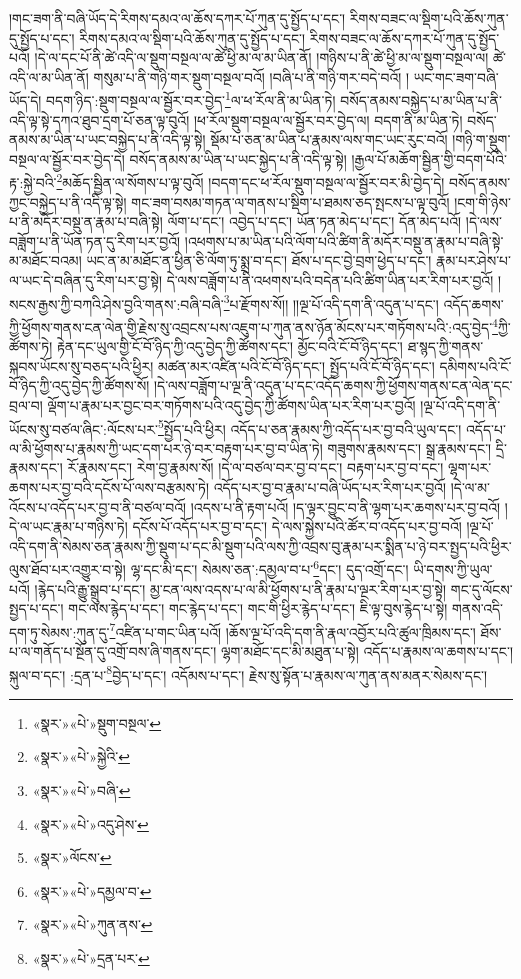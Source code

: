 །གང་ཟག་ནི་བཞི་ཡོད་དེ་རིགས་དམའ་ལ་ཆོས་དཀར་པོ་ཀུན་དུ་སྤྱོད་པ་དང་། རིགས་བཟང་ལ་སྡིག་པའི་ཆོས་ཀུན་དུ་སྤྱོད་པ་དང་། རིགས་དམའ་ལ་སྡིག་པའི་ཆོས་ཀུན་དུ་སྤྱོད་པ་དང་། རིགས་བཟང་ལ་ཆོས་དཀར་པོ་ཀུན་དུ་སྤྱོད་པའོ། །དེ་ལ་དང་པོ་ནི་ཚེ་འདི་ལ་སྡུག་བསྔལ་ལ་ཚེ་ཕྱི་མ་ལ་མ་ཡིན་ནོ། །གཉིས་པ་ནི་ཚེ་ཕྱི་མ་ལ་སྡུག་བསྔལ་ལ། ཚེ་འདི་ལ་མ་ཡིན་ནོ། གསུམ་པ་ནི་གཉི་གར་སྡུག་བསྔལ་བའོ། །བཞི་པ་ནི་གཉི་གར་བདེ་བའོ། །
ཡང་གང་ཟག་བཞི་ཡོད་དེ། བདག་ཉིད་:སྡུག་བསྔལ་ལ་སྦྱོར་བར་བྱེད་\footnote{«སྣར་»«པེ་»སྡུག་བསྔལ་}ལ་ཕ་རོལ་ནི་མ་ཡིན་ཏེ། བསོད་ནམས་བསྐྱེད་པ་མ་ཡིན་པ་ནི་འདི་ལྟ་སྟེ་དཀའ་ཐུབ་དྲག་པོ་ཅན་ལྟ་བུའོ། །ཕ་རོལ་སྡུག་བསྔལ་ལ་སྦྱོར་བར་བྱེད་ལ། བདག་ནི་མ་ཡིན་ཏེ། བསོད་ནམས་མ་ཡིན་པ་ཡང་བསྐྱེད་པ་ནི་འདི་ལྟ་སྟེ། སྡོམ་པ་ཅན་མ་ཡིན་པ་རྣམས་ལས་གང་ཡང་རུང་བའོ། །གཉི་ག་སྡུག་བསྔལ་ལ་སྦྱོར་བར་བྱེད་དེ། བསོད་ནམས་མ་ཡིན་པ་ཡང་སྐྱེད་པ་ནི་འདི་ལྟ་སྟེ། །རྒྱལ་པོ་མཆོག་སྦྱིན་གྱི་བདག་པོའི་རྟ་:སྐྱེ་བའི་\footnote{«སྣར་»«པེ་»སྐྱེའི་}མཆོད་སྦྱིན་ལ་སོགས་པ་ལྟ་བུའོ། །བདག་དང་ཕ་རོལ་སྡུག་བསྔལ་ལ་སྦྱོར་བར་མི་བྱེད་དེ། བསོད་ནམས་ཀྱང་བསྐྱེད་པ་ནི་འདི་ལྟ་སྟེ། གང་ཟག་བསམ་གཏན་ལ་གནས་པ་སྡིག་པ་ཐམས་ཅད་སྤངས་པ་ལྟ་བུའོ། །ངག་གི་ཉེས་པ་ནི་མདོར་བསྡུ་ན་རྣམ་པ་བཞི་སྟེ། ལོག་པ་དང་། འབྱེད་པ་དང་། ཡོན་ཏན་མེད་པ་དང་། དོན་མེད་པའོ། །དེ་ལས་བཟློག་པ་ནི་ཡོན་ཏན་དུ་རིག་པར་བྱའོ། །འཕགས་པ་མ་ཡིན་པའི་ལོག་པའི་ཚིག་ནི་མདོར་བསྡུ་ན་རྣམ་པ་བཞི་སྟེ་མ་མཐོང་བའམ། ཡང་ན་མ་མཐོང་ན་ཕྱིན་ཅི་ལོག་ཏུ་སྨྲ་བ་དང་། ཐོས་པ་དང་བྱེ་བྲག་ཕྱེད་པ་དང་། རྣམ་པར་ཤེས་པ་ལ་ཡང་དེ་བཞིན་དུ་རིག་པར་བྱ་སྟེ། དེ་ལས་བཟློག་པ་ནི་འཕགས་པའི་བདེན་པའི་ཚིག་ཡིན་པར་རིག་པར་བྱའོ། །སངས་རྒྱས་ཀྱི་བཀའི་ཤེས་བྱའི་གནས་:བཞི་བཞི་\footnote{«སྣར་»«པེ་»བཞི་}པ་རྫོགས་སོ།། །།ལྔ་པོ་འདི་དག་ནི་འདུན་པ་དང་། འདོད་ཆགས་ཀྱི་ཕྱོགས་གནས་ངན་ལེན་གྱི་རྗེས་སུ་འབྲངས་པས་འཇུག་པ་ཀུན་ནས་ཉོན་མོངས་པར་གཏོགས་པའི་:འདུ་བྱེད་\footnote{«སྣར་»«པེ་»འདུ་ཤེས་}ཀྱི་ཚོགས་ཏེ། རྟེན་དང་ཡུལ་གྱི་ངོ་བོ་ཉིད་ཀྱི་འདུ་བྱེད་ཀྱི་ཚོགས་དང་། མྱོང་བའི་ངོ་བོ་ཉིད་དང་། ཐ་སྙད་ཀྱི་གནས་སྐབས་ཡོངས་སུ་བཅད་པའི་ཕྱིར། མཚན་མར་འཛིན་པའི་ངོ་བོ་ཉིད་དང་། སྤྱོད་པའི་ངོ་བོ་ཉིད་དང་། དམིགས་པའི་ངོ་བོ་ཉིད་ཀྱི་འདུ་བྱེད་ཀྱི་ཚོགས་སོ། །དེ་ལས་བཟློག་པ་ལྔ་ནི་འདུན་པ་དང་འདོད་ཆགས་ཀྱི་ཕྱོགས་གནས་ངན་ལེན་དང་བྲལ་བ། ལྡོག་པ་རྣམ་པར་བྱང་བར་གཏོགས་པའི་འདུ་བྱེད་ཀྱི་ཚོགས་ཡིན་པར་རིག་པར་བྱའོ། །ལྔ་པོ་འདི་དག་ནི་ཡོངས་སུ་བཙལ་ཞིང་:ལོངས་པར་\footnote{«སྣར་»ལོངས་}སྤྱོད་པའི་ཕྱིར། འདོད་པ་ཅན་རྣམས་ཀྱི་འདོད་པར་བྱ་བའི་ཡུལ་དང་། འདོད་པ་ལ་མི་ཕྱོགས་པ་རྣམས་ཀྱི་ཡང་དག་པར་ཉེ་བར་བརྟག་པར་བྱ་བ་ཡིན་ཏེ། གཟུགས་རྣམས་དང་། སྒྲ་རྣམས་དང་། དྲི་རྣམས་དང་། རོ་རྣམས་དང་། རེག་བྱ་རྣམས་སོ། །དེ་ལ་བཙལ་བར་བྱ་བ་དང་། བརྟག་པར་བྱ་བ་དང་། ལྷག་པར་ཆགས་པར་བྱ་བའི་དངོས་པོ་ལས་བརྩམས་ཏེ། འདོད་པར་བྱ་བ་རྣམ་པ་བཞི་ཡོད་པར་རིག་པར་བྱའོ། །དེ་ལ་མ་འོངས་པ་འདོད་པར་བྱ་བ་ནི་བཙལ་བའོ། །འདས་པ་ནི་རྟག་པའོ། །ད་ལྟར་བྱུང་བ་ནི་ལྷག་པར་ཆགས་པར་བྱ་བའོ། །དེ་ལ་ཡང་རྣམ་པ་གཉིས་ཏེ། དངོས་པོ་འདོད་པར་བྱ་བ་དང་། དེ་ལས་སྐྱེས་པའི་ཚོར་བ་འདོད་པར་བྱ་བའོ། །ལྔ་པོ་འདི་དག་ནི་སེམས་ཅན་རྣམས་ཀྱི་སྡུག་པ་དང་མི་སྡུག་པའི་ལས་ཀྱི་འབྲས་བུ་རྣམ་པར་སྨིན་པ་ཉེ་བར་སྤྱད་པའི་ཕྱིར་ལུས་ཐོབ་པར་འགྱུར་བ་སྟེ། ལྷ་དང་མི་དང་། སེམས་ཅན་:དམྱལ་བ་པ་\footnote{«སྣར་»«པེ་»དམྱལ་བ་}དང་། དུད་འགྲོ་དང་། ཡི་དགས་ཀྱི་ཡུལ་པའོ། །རྙེད་པའི་རྒྱུ་སྒྲུབ་པ་དང་། མྱ་ངན་ལས་འདས་པ་ལ་མི་ཕྱོགས་པ་ནི་རྣམ་པ་ལྔར་རིག་པར་བྱ་སྟེ། གང་དུ་ལོངས་སྤྱད་པ་དང་། གང་ལས་རྙེད་པ་དང་། གང་རྙེད་པ་དང་། གང་གི་ཕྱིར་རྙེད་པ་དང་། ཇི་ལྟ་བུས་རྙེད་པ་སྟེ། གནས་འདི་དག་ཏུ་སེམས་:ཀུན་དུ་\footnote{«སྣར་»«པེ་»ཀུན་ནས་}འཛིན་པ་གང་ཡིན་པའོ། །ཆོས་ལྔ་པོ་འདི་དག་ནི་རྣལ་འབྱོར་པའི་ཚུལ་ཁྲིམས་དང་། ཐོས་པ་ལ་གནོད་པ་སྔོན་དུ་འགྲོ་བས་ཞི་གནས་དང་། ལྷག་མཐོང་དང་མི་མཐུན་པ་སྟེ། འདོད་པ་རྣམས་ལ་ཆགས་པ་དང་། སྐུལ་བ་དང་། :དྲན་པ་\footnote{«སྣར་»«པེ་»དྲན་པར་}བྱེད་པ་དང་། འདོམས་པ་དང་། རྗེས་སུ་སྟོན་པ་རྣམས་ལ་ཀུན་ནས་མནར་སེམས་དང་། 